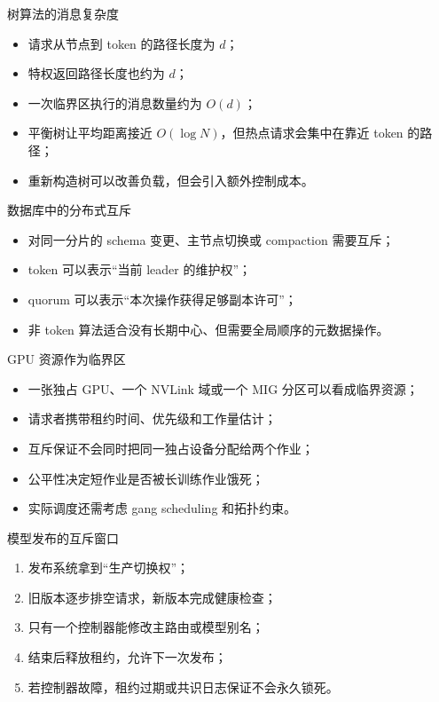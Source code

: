 \documentclass[UTF8,fontset=none,aspectratio=169,10pt]{beamer}
\begin{document}
\begin{frame}{树算法的消息复杂度}
\begin{itemize}
  \item 请求从节点到 token 的路径长度为 $d$；
  \item 特权返回路径长度也约为 $d$；
  \item 一次临界区执行的消息数量约为 $O(d)$；
  \item 平衡树让平均距离接近 $O(\log N)$，但热点请求会集中在靠近 token 的路径；
  \item 重新构造树可以改善负载，但会引入额外控制成本。
\end{itemize}
\end{frame}


\begin{frame}{数据库中的分布式互斥}
\begin{itemize}
  \item 对同一分片的 schema 变更、主节点切换或 compaction 需要互斥；
  \item token 可以表示“当前 leader 的维护权”；
  \item quorum 可以表示“本次操作获得足够副本许可”；
  \item 非 token 算法适合没有长期中心、但需要全局顺序的元数据操作。
\end{itemize}
\end{frame}

\begin{frame}{GPU 资源作为临界区}
\begin{itemize}
  \item 一张独占 GPU、一个 NVLink 域或一个 MIG 分区可以看成临界资源；
  \item 请求者携带租约时间、优先级和工作量估计；
  \item 互斥保证不会同时把同一独占设备分配给两个作业；
  \item 公平性决定短作业是否被长训练作业饿死；
  \item 实际调度还需考虑 gang scheduling 和拓扑约束。
\end{itemize}
\end{frame}

\begin{frame}{模型发布的互斥窗口}
\begin{enumerate}
  \item 发布系统拿到“生产切换权”；
  \item 旧版本逐步排空请求，新版本完成健康检查；
  \item 只有一个控制器能修改主路由或模型别名；
  \item 结束后释放租约，允许下一次发布；
  \item 若控制器故障，租约过期或共识日志保证不会永久锁死。
\end{enumerate}
\end{frame}
\end{document}
